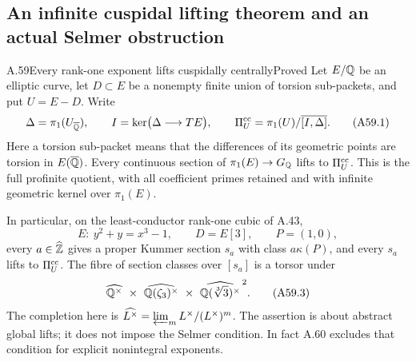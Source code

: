 \subsection{An infinite cuspidal lifting theorem and an actual Selmer obstruction}

\begin{statement}{A.59}{Every rank-one exponent lifts cuspidally centrally}{Proved}
Let $E/\mathbb Q$ be an elliptic curve, let $D\subset E$ be a nonempty finite
union of torsion sub-packets, and put $U=E-D$. Write
\[
 \Delta=\pi_1(U_{\overline{\mathbb Q}}),\qquad
 I=\ker\bigl(\Delta\longrightarrow T E\bigr),\qquad
 \Pi^{\rm cc}_U=\pi_1(U)/\overline{[I,\Delta]}.
 \tag{A59.1}
\]
Here a torsion sub-packet means that the differences of its geometric
points are torsion in $E(\overline{\mathbb Q})$. Every continuous section of
$\pi_1(E)\to G_\mathbb Q$ lifts to $\Pi^{\rm cc}_U$. This is the full
profinite quotient, with all coefficient primes retained and with
infinite geometric kernel over $\pi_1(E)$.

In particular, on the least-conductor rank-one cubic of A.43,
\[
 E:\ y^2+y=x^3-1,\qquad D=E[3],\qquad P=(1,0),
 \tag{A59.2}
\]
every $a\in\widehat{\mathbb Z}$ gives a proper Kummer section $s_a$ with class
$a\kappa(P)$, and every $s_a$ lifts to $\Pi^{\rm cc}_U$. The fibre of
section classes over $[s_a]$ is a torsor under
\[
 \widehat{\Q^\times}\ \times\
 \widehat{\Q(\zeta_3)^\times}\ \times\
 \widehat{\Q(\sqrt[3]{3})^\times}^{\,2}.
 \tag{A59.3}
\]
The completion here is $\widehat{L^\times}=\varprojlim_m
L^\times/(L^\times)^m$. The assertion is about abstract global lifts;
it does not impose the Selmer condition. In fact A.60 excludes that
condition for explicit nonintegral exponents.
\end{statement}

